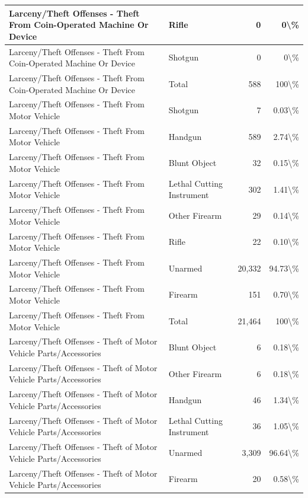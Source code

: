 \documentclass[
]{krantz}
\begin{document}
\begin{longtable}[t]{l|l|r|r}
Larceny/Theft Offenses - Theft From Coin-Operated Machine Or Device & Rifle & 0 & 0\textbackslash{}\%\\
\hline
Larceny/Theft Offenses - Theft From Coin-Operated Machine Or Device & Shotgun & 0 & 0\textbackslash{}\%\\
\hline
Larceny/Theft Offenses - Theft From Coin-Operated Machine Or Device & Total & 588 & 100\textbackslash{}\%\\
\hline
Larceny/Theft Offenses - Theft From Motor Vehicle & Shotgun & 7 & 0.03\textbackslash{}\%\\
\hline
Larceny/Theft Offenses - Theft From Motor Vehicle & Handgun & 589 & 2.74\textbackslash{}\%\\
\hline
Larceny/Theft Offenses - Theft From Motor Vehicle & Blunt Object & 32 & 0.15\textbackslash{}\%\\
\hline
Larceny/Theft Offenses - Theft From Motor Vehicle & Lethal Cutting Instrument & 302 & 1.41\textbackslash{}\%\\
\hline
Larceny/Theft Offenses - Theft From Motor Vehicle & Other Firearm & 29 & 0.14\textbackslash{}\%\\
\hline
Larceny/Theft Offenses - Theft From Motor Vehicle & Rifle & 22 & 0.10\textbackslash{}\%\\
\hline
Larceny/Theft Offenses - Theft From Motor Vehicle & Unarmed & 20,332 & 94.73\textbackslash{}\%\\
\hline
Larceny/Theft Offenses - Theft From Motor Vehicle & Firearm & 151 & 0.70\textbackslash{}\%\\
\hline
Larceny/Theft Offenses - Theft From Motor Vehicle & Total & 21,464 & 100\textbackslash{}\%\\
\hline
Larceny/Theft Offenses - Theft of Motor Vehicle Parts/Accessories & Blunt Object & 6 & 0.18\textbackslash{}\%\\
\hline
Larceny/Theft Offenses - Theft of Motor Vehicle Parts/Accessories & Other Firearm & 6 & 0.18\textbackslash{}\%\\
\hline
Larceny/Theft Offenses - Theft of Motor Vehicle Parts/Accessories & Handgun & 46 & 1.34\textbackslash{}\%\\
\hline
Larceny/Theft Offenses - Theft of Motor Vehicle Parts/Accessories & Lethal Cutting Instrument & 36 & 1.05\textbackslash{}\%\\
\hline
Larceny/Theft Offenses - Theft of Motor Vehicle Parts/Accessories & Unarmed & 3,309 & 96.64\textbackslash{}\%\\
\hline
Larceny/Theft Offenses - Theft of Motor Vehicle Parts/Accessories & Firearm & 20 & 0.58\textbackslash{}\%\\

\end{longtable}
\end{document}
